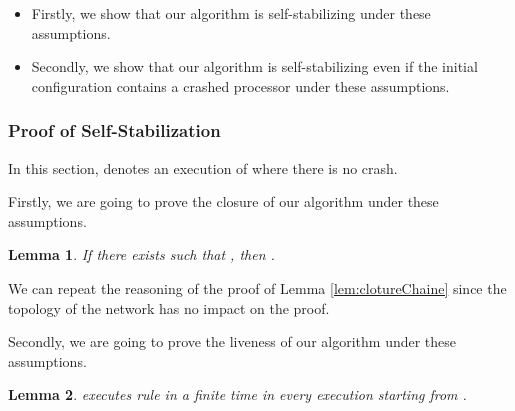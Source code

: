 \documentclass[11pt,english,letterpaper]{article}
\newtheorem{lemma}{Lemma}
\newenvironment{proof}{{\noindent\bf Proof. } }{{\hfill }}
\begin{document}
\begin{itemize}
\item Firstly, we show that our algorithm is self-stabilizing under these assumptions.
\item Secondly, we show that our algorithm is self-stabilizing even if the initial configuration contains a crashed processor under these assumptions.
\end{itemize}

\subsubsection{Proof of Self-Stabilization}

In this section,  denotes an execution of  where there is no crash.

Firstly, we are going to prove the closure of our algorithm under these assumptions.

\begin{lemma}\label{lem:clotureAnneau}
If there exists  such that , then .
\end{lemma}

\begin{proof}
We can repeat the reasoning of the proof of Lemma \ref{lem:clotureChaine} since the topology of the network has no impact on the proof.
\end{proof}
		
Secondly, we are going to prove the liveness of our algorithm under these assumptions.

\begin{lemma}\label{lem:prelemVivaciteAnneau}
  executes rule  in a finite time in every execution starting from .
\end{lemma}
\end{document}

